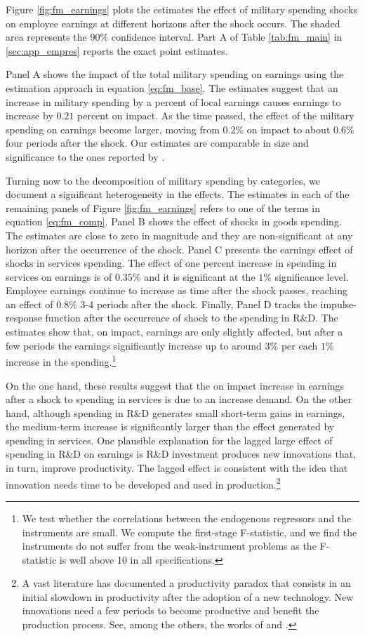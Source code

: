 \documentclass[dv_diss_main.tex]{subfiles}
\begin{document}
Figure \ref{fig:fm_earnings} plots the estimates the effect of military spending shocks on employee earnings at different horizons after the shock occurs. The shaded area represents the $90\%$ confidence interval. Part A of Table \ref{tab:fm_main} in \ref{sec:app_empres} reports the exact point estimates.

Panel A shows the impact of the total military spending on earnings using the estimation approach in equation \eqref{eq:fm_base}. The estimates suggest that an increase in military spending by a percent of local earnings causes earnings to increase by $0.21$ percent on impact. As the time passed, the effect of the military spending on earnings become larger, moving from $0.2\%$ on impact to about $0.6\%$ four periods after the shock. Our estimates are comparable in size and significance to the ones reported by \cite{Auerbach2020}. 

Turning now to the decomposition of military spending by categories, we document a significant heterogeneity in the effects. The estimates in each of the remaining panels of Figure \ref{fig:fm_earnings} refers to one of the terms in equation \eqref{eq:fm_comp}. Panel B shows the effect of shocks in goods spending. The estimates are close to zero in magnitude and they are non-significant at any horizon after the occurrence of the shock. Panel C presents the earnings effect of shocks in services spending. The effect of one percent increase in spending in services on earnings is of $0.35\%$ and it is significant at the $1\%$ significance level. Employee earnings continue to increase as time after the shock passes, reaching an effect of $0.8\%$ 3-4 periods after the shock. Finally, Panel D tracks the impulse-response function after the occurrence of shock to the spending in R\&D. The estimates show that, on impact, earnings are only slightly affected, but after a few periods the earnings significantly increase up to around $3\%$ per each $1\%$ increase in the spending.\footnote{We test whether the correlations between the endogenous regressors and the instruments are small. We compute the first-stage F-statistic, and we find the instruments do not suffer from the weak-instrument problems as the F-statistic is well above 10 in all specifications.}

On the one hand, these results suggest that the on impact increase in earnings after a shock to spending in services is due to an increase demand. On the other hand, although spending in R\&D generates small short-term gains in earnings, the medium-term increase is significantly larger than the effect generated by spending in services. One plausible explanation for the lagged large effect of spending in R\&D on earnings is R\&D investment produces new innovations that, in turn, improve productivity. The lagged effect is consistent with the idea that innovation needs time to be developed and used in production.\footnote{A vast literature has documented a productivity paradox that consists in an initial slowdown in productivity after the adoption of a new technology. New innovations need a few periods to become productive and benefit the production process. See, among the others, the works of \cite{Huggett2001} and \cite{Acemoglu2014}.}
\end{document}
